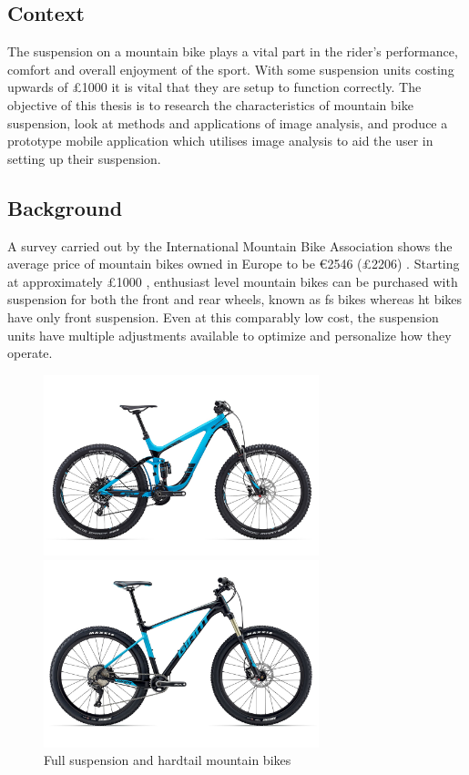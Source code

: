 \subsection{Context}
	The suspension on a mountain bike plays a vital part in the rider's performance, comfort and overall enjoyment of the sport. With some suspension units costing upwards of \pounds1000 it is vital that they are setup to function correctly. The objective of this thesis is to research the characteristics of mountain bike suspension, look at methods and applications of image analysis, and produce a prototype mobile application which utilises image analysis to aid the user in setting up their suspension.
\subsection{Background}
	A survey carried out by the International Mountain Bike Association shows the average price of mountain bikes owned in Europe to be \euro2546 (\pounds2206) \citep{imbasurv}. Starting at approximately \pounds1000 \citep{giantstance}, enthusiast level mountain bikes can be purchased with suspension for both the front and rear wheels, known as \gls{fs} bikes whereas \gls{ht} bikes have only front suspension. Even at this comparably low cost, the suspension units have multiple adjustments available to optimize and personalize how they operate.
	\begin{figure}[h!]
		\centering
		\begin{minipage}{0.45\textwidth}
			\centering
			\includegraphics[width=8cm]{../images/2016_Giant_Reign_Advanced_275_0.jpg}
		\end{minipage}\hfill
		\begin{minipage}{0.45\textwidth}
			\centering
			\includegraphics[width=8cm]{../images/2017_GIANT_FATHOM_1.jpg}
		\end{minipage}
		\caption{Full suspension and hardtail mountain bikes}
		\label{fig:fsandht}
	\end{figure}
